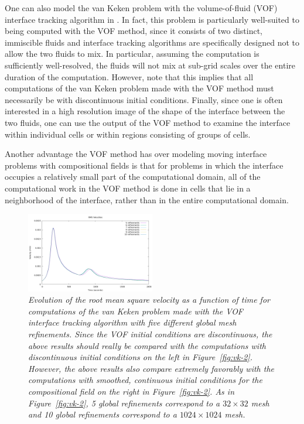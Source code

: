 One can also model the van Keken problem with the volume-of-fluid (VOF) interface tracking 
algorithm in \aspect{}.
In fact, this problem is particularly well-suited to being computed with the VOF method, since 
it consists of two distinct, immiscible fluids and interface tracking algorithms are 
specifically designed not to allow the two fluids to mix.
In particular, assuming the computation is sufficiently well-resolved, the fluids will not mix 
at sub-grid scales over the entire duration of the computation.
However, note that this implies that all computations of the van Keken problem made with the VOF 
method must necessarily be with discontinuous initial conditions.
Finally, since one is often interested in a high resolution image of the shape of the interface 
between the two fluids, one can use the output of the VOF method to examine the interface 
within individual cells or within regions consisting of groups of cells.

Another advantage the VOF method has over modeling moving interface problems with compositional 
fields is that for problems in which the interface occupies a relatively small part of the 
computational domain, all of the computational work in the VOF method is done in cells that lie 
in a neighborhood of the interface, rather than in the entire computational domain. 

\begin{figure}
   \centering
\includegraphics[width=0.5\textwidth]{cookbooks/van-keken-vof/doc/rms_vel_comparison.png}
   \caption{\it Evolution of the root mean square velocity as a function of time for computations 
    of the van Keken problem made with the VOF interface tracking algorithm with five 
    different global mesh refinements.
    Since the VOF initial conditions are discontinuous, the above results should really be 
    compared with the computations with discontinuous initial conditions on the left in 
    Figure~\ref{fig:vk-2}. However, the above results also compare extremely favorably with the 
    computations with smoothed, continuous initial conditions for the compositional field on 
    the right in Figure~\ref{fig:vk-2}.
    As in Figure~\ref{fig:vk-2}, 5 global refinements correspond to a $32 \times 32$ mesh and 10 global refinements correspond to a $1024 \times 1024$ mesh.}
    \label{fig:vof-vk-1}
\end{figure}

